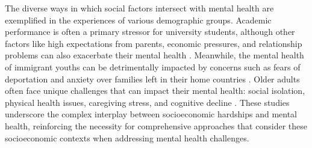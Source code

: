 The diverse ways in which social factors intersect with mental health are exemplified in the experiences of various demographic groups. Academic performance is often a primary stressor for university students, although other factors like high expectations from parents, economic pressures, and relationship problems can also exacerbate their mental health \cite{de2016relationship, bruffaerts2018mental, bhattacharjee2021understanding, lattie2020designing}. Meanwhile, the mental health of immigrant youths can be detrimentally impacted by concerns such as fears of deportation and anxiety over families left in their home countries \cite{tachtler2021unaccompanied, tachtler2020supporting, jakobsen2017impact}. Older adults often face unique challenges that can impact their mental health: social isolation, physical health issues, caregiving stress, and cognitive decline \cite{carod2017social, mccrone2008paying, huisman2013socioeconomic}.
These studies underscore the complex interplay between socioeconomic hardships and mental health, reinforcing the necessity for comprehensive approaches that consider these socioeconomic contexts when addressing mental health challenges.






